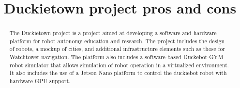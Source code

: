 \documentclass[conference]{IEEEtran}
\begin{document}
%
\title{Duckietown project pros and cons}

\author{


\and


\and


\and 


}

\maketitle              %

\begin{abstract}
The Duckietown project is a project aimed at developing a software and hardware platform for robot autonomy education and research. The project includes the design of robots, a mockup of cities, and additional infrastructure elements such as those for Watchtower navigation. The platform also includes a software-based Duckebot-GYM robot simulator that allows simulation of robot operation in a virtualized environment. It also includes the use of a Jetson Nano platform to control the duckiebot robot with hardware GPU support.
\end{abstract}
\end{document}
